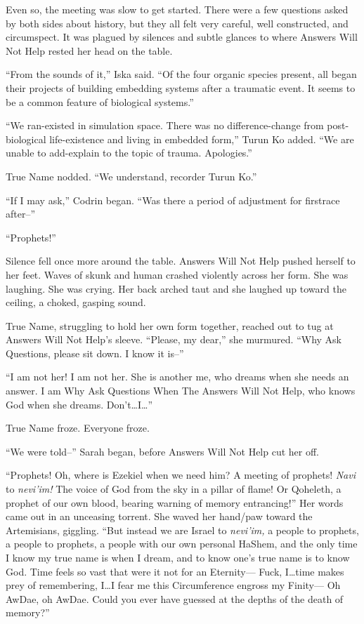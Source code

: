 Even so, the meeting was slow to get started. There were a few questions asked by both sides about history, but they all felt very careful, well constructed, and circumspect. It was plagued by silences and subtle glances to where Answers Will Not Help rested her head on the table.

``From the sounds of it,'' Iska said. ``Of the four organic species present, all began their projects of building embedding systems after a traumatic event. It seems to be a common feature of biological systems.''

``We ran-existed in simulation space. There was no difference-change from post-biological life-existence and living in embedded form,'' Turun Ko added. ``We are unable to add-explain to the topic of trauma. Apologies.''

True Name nodded. ``We understand, recorder Turun Ko.''

``If I may ask,'' Codrin began. ``Was there a period of adjustment for firstrace after--''

``Prophets!''

Silence fell once more around the table. Answers Will Not Help pushed herself to her feet. Waves of skunk and human crashed violently across her form. She was laughing. She was crying. Her back arched taut and she laughed up toward the ceiling, a choked, gasping sound.

True Name, struggling to hold her own form together, reached out to tug at Answers Will Not Help's sleeve. ``Please, my dear,'' she murmured. ``Why Ask Questions, please sit down. I know it is--''

``I am not her! I am not her. She is another me, who dreams when she needs an answer. I am Why Ask Questions When The Answers Will Not Help, who knows God when she dreams. Don't\ldots I\ldots{}''

True Name froze. Everyone froze.

``We were told--'' Sarah began, before Answers Will Not Help cut her off.

``Prophets! Oh, where is Ezekiel when we need him? A meeting of prophets! \emph{Navi} to \emph{nevi'im!} The voice of God from the sky in a pillar of flame! Or Qoheleth, a prophet of our own blood, bearing warning of memory entrancing!'' Her words came out in an unceasing torrent. She waved her hand/paw toward the Artemisians, giggling. ``But instead we are Israel to \emph{nevi'im,} a people to prophets, a people to prophets, a people with our own personal HaShem, and the only time I know my true name is when I dream, and to know one's true name is to know God. Time feels so vast that were it not for an Eternity— Fuck, I\ldots time makes prey of remembering, I\ldots I fear me this Circumference engross my Finity— Oh AwDae, oh AwDae. Could you ever have guessed at the depths of the death of memory?''

